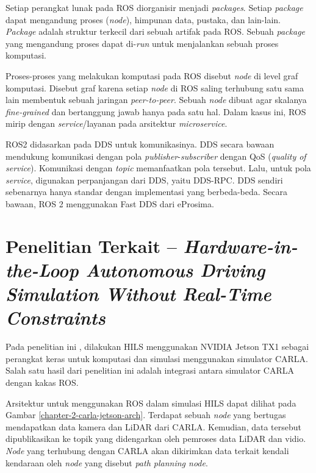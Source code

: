Setiap perangkat lunak pada ROS diorganisir menjadi \textit{packages}. Setiap
\textit{package} dapat mengandung proses (\textit{node}), himpunan data,
pustaka, dan lain-lain. \textit{Package} adalah struktur terkecil dari sebuah
artifak pada ROS. Sebuah \textit{package} yang mengandung proses dapat
di-\textit{run} untuk menjalankan sebuah proses komputasi.

Proses-proses yang melakukan komputasi pada ROS disebut \textit{node} di level
graf komputasi. Disebut graf karena setiap \textit{node} di ROS saling terhubung
satu sama lain membentuk sebuah jaringan \textit{peer-to-peer}. Sebuah
\textit{node} dibuat agar skalanya \textit{fine-grained} dan bertanggung jawab
hanya pada satu hal. Dalam kasus ini, ROS mirip dengan \textit{service}/layanan
pada arsitektur \textit{microservice}.

ROS2 didasarkan pada DDS untuk komunikasinya. DDS secara bawaan mendukung
komunikasi dengan pola \textit{publisher}-\textit{subscriber} dengan QoS
(\textit{quality of service}). Komunikasi dengan \textit{topic} memanfaatkan
pola tersebut. Lalu, untuk pola \textit{service}, digunakan perpanjangan dari
DDS, yaitu DDS-RPC. DDS sendiri sebenarnya hanya standar dengan implementasi
yang berbeda-beda. Secara bawaan, ROS 2 menggunakan Fast DDS dari eProsima.

\section{Penelitian Terkait -- \textit{Hardware-in-the-Loop Autonomous Driving Simulation Without
	  Real-Time Constraints}}\label{chapter-2-section-related-works}

Pada penelitian ini \parencite{brogle_CarlaHILS}, dilakukan HILS menggunakan
NVIDIA Jetson TX1 sebagai perangkat keras untuk komputasi dan simulasi
menggunakan simulator CARLA. Salah satu hasil dari penelitian ini adalah
integrasi antara simulator CARLA dengan kakas ROS.

Arsitektur untuk menggunakan ROS dalam simulasi HILS dapat dilihat pada Gambar
\ref{chapter-2-carla-jetson-arch}. Terdapat sebuah \textit{node}  yang
bertugas mendapatkan data kamera dan LiDAR dari CARLA. Kemudian, data tersebut
dipublikasikan ke topik yang didengarkan oleh pemroses data LiDAR dan vidio.
\textit{Node} yang terhubung dengan CARLA akan dikirimkan data terkait kendali
kendaraan oleh \textit{node} yang disebut \textit{path planning node}.


